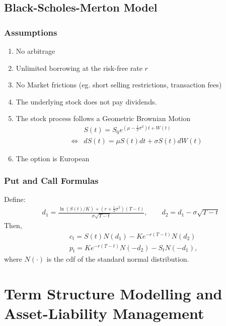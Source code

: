\documentclass[11pt]{article}
\begin{document}
	\subsection{Black-Scholes-Merton Model}
	\subsubsection{Assumptions}
	\begin{enumerate}
		\item No arbitrage
		\item Unlimited borrowing at the risk-free rate \( r \)
		\item No Market frictions (eg. short selling restrictions, transaction fees)
		\item The underlying stock does not pay dividends.
		\item The stock process follows a Geometric Brownian Motion
		\begin{align*}
			&S(t) = S_0 e^{\left(\mu - \frac{1}{2} \sigma^2\right)t + W(t)}
			\\[4pt]
			\iff &dS(t) = \mu S(t) dt + \sigma S(t) dW(t)
		\end{align*}
		\item The option is European
	\end{enumerate}
	\subsubsection{Put and Call Formulas}
	Define:
	\begin{align*}
		d_1 = \frac{\ln\left(S(t)/ K\right) +\left(r + \frac{1}{2}\sigma^2\right)(T - t)}{\sigma\sqrt{T - t}},\qquad d_2 
		= d_1 - \sigma\sqrt{T - t}
	\end{align*}
	Then,
	\begin{align*}
		& c_t = S(t)N(d_1) - Ke^{-r(T - t)}N(d_2)\\[4pt]
		& p_t = Ke^{-r(T - t)}N(-d_2) - S_t N(-d_1),
	\end{align*}
	where \( N(\cdot) \) is the cdf of the standard normal distribution.
	\section{Term Structure Modelling and Asset-Liability Management}
\end{document}
